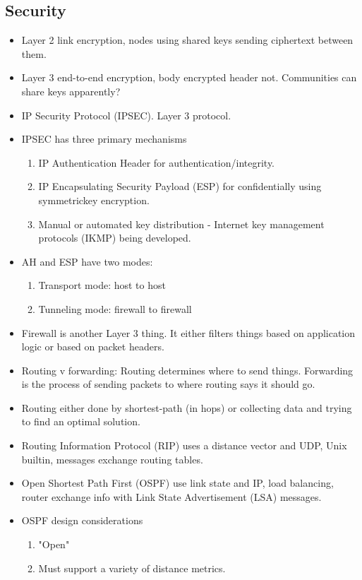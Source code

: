 \documentclass{scrartcl}
\begin{document}
\subsection*{Security}
\begin{itemize}
\item Layer 2 link encryption, nodes using shared keys sending ciphertext 
between them.
\item Layer 3 end-to-end encryption, body encrypted header not. Communities can
share keys apparently?
\item IP Security Protocol (IPSEC). Layer 3 protocol.
\item IPSEC has three primary mechanisms
\begin{enumerate}
\item IP Authentication Header for authentication/integrity.
\item IP Encapsulating Security Payload (ESP) for confidentially using
symmetrickey encryption.
\item Manual or automated key distribution - Internet key management protocols
(IKMP) being developed.
\end{enumerate}
\item AH and ESP have two modes:
\begin{enumerate}
\item Transport mode: host to host
\item Tunneling mode: firewall to firewall
\end{enumerate}
\item Firewall is another Layer 3 thing. It either filters things based on
application logic or based on packet headers.
\item Routing v forwarding: Routing determines where to send things. Forwarding
is the process of sending packets to where routing says it should go.
\item Routing either done by shortest-path (in hops) or collecting data and 
trying to find an optimal solution.
\item Routing Information Protocol (RIP) uses a distance vector and UDP,
Unix builtin, messages exchange routing tables.
\item Open Shortest Path First (OSPF) use link state and IP, load balancing,
router exchange info with Link State Advertisement (LSA) messages.
\item OSPF design considerations
\begin{enumerate}
\item "Open"
\item Must support a variety of distance metrics.

\end{enumerate}
\end{itemize}
\end{document}
